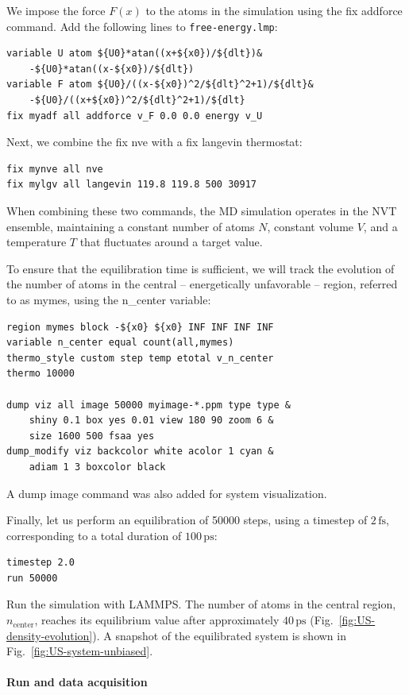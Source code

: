 \documentclass[9pt,tutorial]{livecoms}
\newcommand{\lmpcmd}[1]{\hspace{0pt}\colorbox{listing}{\textcolor{command}{\small{#1}}}\hspace{0pt}} %
\newcommand{\flecmd}[1]{\textcolor{command}{\texttt{#1}}} %
\begin{document}
We impose the force $F(x)$ to the atoms in the simulation
using the \lmpcmd{fix addforce} command.  Add the following
lines to \flecmd{free-energy.lmp}:
\begin{lstlisting}
variable U atom ${U0}*atan((x+${x0})/${dlt})&
    -${U0}*atan((x-${x0})/${dlt})
variable F atom ${U0}/((x-${x0})^2/${dlt}^2+1)/${dlt}&
    -${U0}/((x+${x0})^2/${dlt}^2+1)/${dlt}
fix myadf all addforce v_F 0.0 0.0 energy v_U
\end{lstlisting}
Next, we combine the \lmpcmd{fix nve} with a \lmpcmd{fix langevin} thermostat:
\begin{lstlisting}
fix mynve all nve
fix mylgv all langevin 119.8 119.8 500 30917
\end{lstlisting}
When combining these two commands, the MD simulation operates
in the NVT ensemble, maintaining a constant number of
atoms $N$, constant volume $V$, and a temperature $T$ that
fluctuates around a target value.

To ensure that the equilibration time is sufficient, we will track the evolution of
the number of atoms in the central -- energetically unfavorable -- region,
referred to as \lmpcmd{mymes}, using the \lmpcmd{n\_center} variable:
\begin{lstlisting}
region mymes block -${x0} ${x0} INF INF INF INF
variable n_center equal count(all,mymes)
thermo_style custom step temp etotal v_n_center
thermo 10000

dump viz all image 50000 myimage-*.ppm type type &
    shiny 0.1 box yes 0.01 view 180 90 zoom 6 &
    size 1600 500 fsaa yes
dump_modify viz backcolor white acolor 1 cyan &
    adiam 1 3 boxcolor black
\end{lstlisting}
A \lmpcmd{dump image} command was also added for system visualization.

Finally, let us perform an equilibration of 50000 steps,
using a timestep of $2\,\text{fs}$, corresponding to a total duration of $100\,\text{ps}$:
\begin{lstlisting}
timestep 2.0
run 50000
\end{lstlisting}
Run the simulation with LAMMPS.  The number of atoms in the
central region, $n_\mathrm{center}$, reaches
its equilibrium value after approximately $40\,\text{ps}$
(Fig.~\ref{fig:US-density-evolution}).  A snapshot of the
equilibrated system is shown in Fig.~\ref{fig:US-system-unbiased}.

\paragraph{Run and data acquisition}
\end{document}
